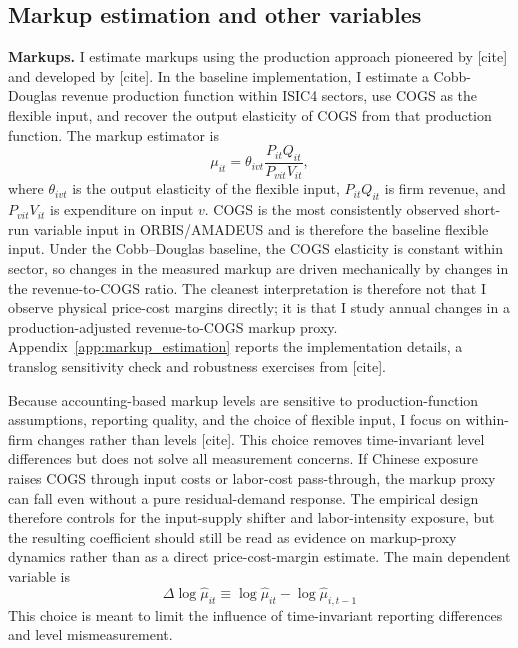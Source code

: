 \documentclass[12pt]{article}
\newcommand{\parencite}[2][]{[cite]}
\newcommand{\textcite}[2][]{[cite]}
\begin{document}
\subsection{Markup estimation and other variables}

\textbf{Markups.} I estimate markups using the production approach pioneered by \textcite{hallRelationPriceMarginal1988} and developed by \textcite{deloeckerMarkupsFirmLevelExport2012,deloeckerRiseMarketPower2020}. In the baseline implementation, I estimate a Cobb-Douglas revenue production function within ISIC4 sectors, use COGS as the flexible input, and recover the output elasticity of COGS from that production function. The markup estimator is
\[
\mu_{it} = \theta_{ivt} \frac{P_{it}Q_{it}}{P_{vit}V_{it}},
\]
where $\theta_{ivt}$ is the output elasticity of the flexible input, $P_{it}Q_{it}$ is firm revenue, and $P_{vit}V_{it}$ is expenditure on input $v$. COGS is the most consistently observed short-run variable input in ORBIS/AMADEUS and is therefore the baseline flexible input. Under the Cobb--Douglas baseline, the COGS elasticity is constant within sector, so changes in the measured markup are driven mechanically by changes in the revenue-to-COGS ratio. The cleanest interpretation is therefore not that I observe physical price-cost margins directly; it is that I study annual changes in a production-adjusted revenue-to-COGS markup proxy. Appendix~\ref{app:markup_estimation} reports the implementation details, a translog sensitivity check and robustness exercises from \textcite{kirovMeasuringMarkupsRevenue2026}.

Because accounting-based markup levels are sensitive to production-function assumptions, reporting quality, and the choice of flexible input, I focus on within-firm changes rather than levels \parencite{deridderHitchhikersGuideMarkup2026}. This choice removes time-invariant level differences but does not solve all measurement concerns. If Chinese exposure raises COGS through input costs or labor-cost pass-through, the markup proxy can fall even without a pure residual-demand response. The empirical design therefore controls for the input-supply shifter and labor-intensity exposure, but the resulting coefficient should still be read as evidence on markup-proxy dynamics rather than as a direct price-cost-margin estimate. The main dependent variable is
\[
\Delta \log \hat{\mu}_{it} \equiv \log \hat{\mu}_{it} - \log \hat{\mu}_{i,t-1}
\]
This choice is meant to limit the influence of time-invariant reporting differences and level mismeasurement.
\end{document}
